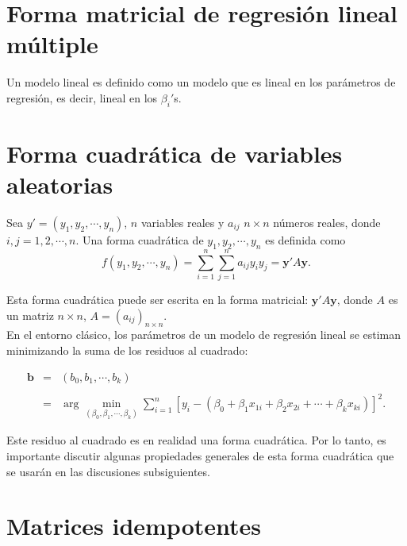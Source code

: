 \section{Forma matricial de regresión lineal múltiple}

\begin{def.}
    Un modelo lineal es definido como un modelo que es lineal en los parámetros de regresión, es decir, lineal en los $\beta_i'$s.
\end{def.}


\section{Forma cuadrática de variables aleatorias}

\begin{def.}
    Sea $y'=(y_1,y_2,\cdots,y_n)$, $n$ variables reales y $a_{ij}$ $n\times n$ números reales, donde $i,j=1,2,\cdots,n.$ Una forma cuadrática de $y_1,y_2,\cdots,y_n$ es definida como
    $$f(y_1,y_2,\cdots,y_n)=\sum_{i=1}^n\sum_{j=1}^n a_{ij}y_iy_j=\textbf{y}'A\textbf{y}.$$
\end{def.}

Esta forma cuadrática puede ser escrita en la forma matricial: $\textbf{y}'A\textbf{y}$, donde $A$ es un matriz $n\times n$, $A=(a_{ij})_{n\times n}$.\\

En el entorno clásico, los parámetros de un modelo de regresión lineal se estiman minimizando la suma de los residuos al cuadrado:

$$
\begin{array}{rcl}
    \textbf{b} &=& (b_0,b_1,\cdots, b_k)\\\\
	       &=& \arg\min_{(\beta_0,\beta_1,\cdots,\beta_k)}\displaystyle\sum_{i=1}^n \left[y_i-\left(\beta_0+\beta_1x_{1i}+\beta_2x_{2i}+\cdots+\beta_{k}x_{ki}\right)\right]^2.
\end{array}
$$

Este residuo al cuadrado es en realidad una forma cuadrática. Por lo tanto, es importante discutir algunas propiedades generales de esta forma cuadrática que se usarán en las discusiones subsiguientes.


\section{Matrices idempotentes}

